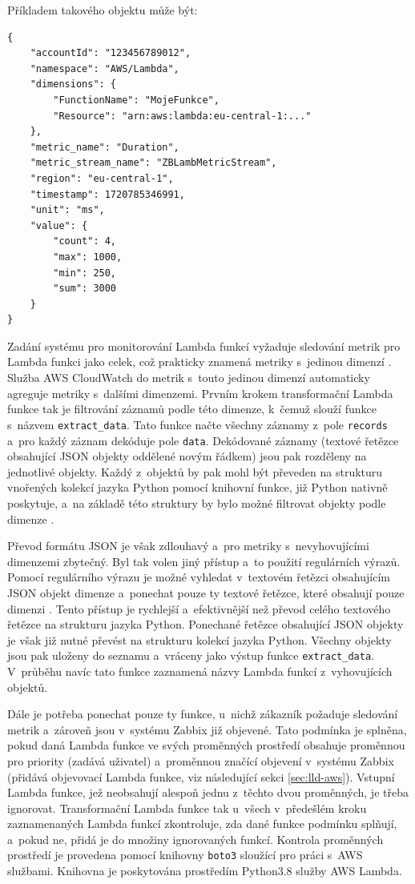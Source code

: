 \documentclass[czech, ing, kiv, he, iso690]{fasthesis}
\begin{document}
Příkladem takového objektu může být:

\begin{verbatim}
{
    "accountId": "123456789012",
    "namespace": "AWS/Lambda",
    "dimensions": {
        "FunctionName": "MojeFunkce",
        "Resource": "arn:aws:lambda:eu-central-1:..."
    },
    "metric_name": "Duration",
    "metric_stream_name": "ZBLambMetricStream",
    "region": "eu-central-1",
    "timestamp": 1720785346991,
    "unit": "ms",
    "value": {
        "count": 4,
        "max": 1000,
        "min": 250,
        "sum": 3000
    }
}
\end{verbatim}

Zadání systému pro monitorování Lambda funkcí vyžaduje sledování metrik pro Lambda funkci jako celek, což prakticky znamená metriky s~jedinou dimenzí . Služba AWS CloudWatch do metrik s~touto jedinou dimenzí automaticky agreguje metriky s~dalšími dimenzemi. Prvním krokem transformační Lambda funkce tak je filtrování záznamů podle této dimenze, k~čemuž slouží funkce s~názvem \verb|extract_data|. Tato funkce načte všechny záznamy z~pole \verb|records| a~pro každý záznam dekóduje pole \verb|data|. Dekódované záznamy (textové řetězce obsahující JSON objekty oddělené novým řádkem) jsou pak rozděleny na jednotlivé objekty. Každý z~objektů by pak mohl být převeden na strukturu vnořených kolekcí jazyka Python pomocí knihovní funkce, již Python nativně poskytuje, a~na základě této struktury by bylo možné filtrovat objekty podle dimenze . 

Převod formátu JSON je však zdlouhavý a~pro metriky s~nevyhovujícími dimenzemi zbytečný. Byl tak volen jiný přístup a~to použití regulárních výrazů. Pomocí regulárního výrazu je možné vyhledat v~textovém řetězci obsahujícím JSON objekt dimenze a~ponechat pouze ty textové řetězce, které obsahují pouze dimenzi . Tento přístup je rychlejší a~efektivnější než převod celého textového řetězce na strukturu jazyka Python. Ponechané řetězce obsahující JSON objekty je však již nutné převést na strukturu kolekcí jazyka Python. Všechny objekty jsou pak uloženy do seznamu a~vráceny jako výstup funkce \verb|extract_data|. V~průběhu navíc tato funkce zaznamená názvy Lambda funkcí z~vyhovujících objektů.

Dále je potřeba ponechat pouze ty funkce, u~nichž zákazník požaduje sledování metrik a~zároveň jsou v~systému Zabbix již objevené. Tato podmínka je splněna, pokud daná Lambda funkce ve svých proměnných prostředí obsahuje proměnnou pro priority (zadává uživatel) a~proměnnou značící objevení v~systému Zabbix (přidává objevovací Lambda funkce, viz následující sekci \ref{sec:lld-aws}). Vstupní Lambda funkce, jež neobsahují alespoň jednu z~těchto dvou proměnných, je třeba ignorovat. Transformační Lambda funkce tak u~všech v~předešlém kroku zaznamenaných Lambda funkcí zkontroluje, zda dané funkce podmínku splňují, a~pokud ne, přidá je do množiny ignorovaných funkcí. Kontrola proměnných prostředí je provedena pomocí knihovny \verb|boto3| sloužící pro práci s~AWS službami. Knihovna je poskytována prostředím Python3.8 služby AWS Lambda.
\end{document}
